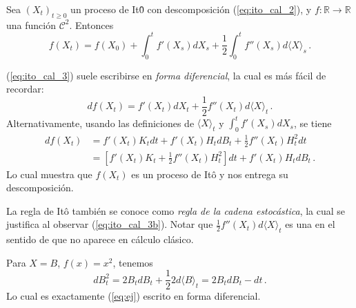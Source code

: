 \begin{theorem}
Sea $(X_t)_{t \ge 0}$ un proceso de It\^{0} con descomposición (\ref{eq:ito_cal_2}), y $f: \mathbb{R} \to  \mathbb{R}$ una función $\mathcal{C}^2$. Entonces 
\begin{equation*}
    \label{eq:ito_cal_3}
    \tag{$\star$}
    f(X_t)  = f(X_0) + \int_{0}^{t} f'(X_s) dX_s +  \frac{1}{2}\int_{0}^{t} f''(X_s) d \langle X \rangle_s\,.
\end{equation*}
\end{theorem}

\begin{remark}
(\ref{eq:ito_cal_3}) suele escribirse en \textit{forma diferencial}, la cual es más fácil de 
recordar: 
\begin{equation*}
    \label{eq:ito_cal_3b}
    \tag{$\square$}
    df(X_t) = f'(X_t)dX_t + \frac{1}{2} f''(X_t)d\langle X \rangle_t\,.
\end{equation*}
Alternativamente, usando las definiciones de $\langle X \rangle_t$  y $\int_{0}^{t} f'(X_s) dX_s$, se tiene 
\begin{align*}
    df(X_t) 
    &= f'(X_t) K_t dt + f'(X_t) H_t dB_t + \frac{1}{2} f''(X_t) H^2_t dt \\ 
    &= \left[ f'(X_t) K_t + \frac{1}{2} f''(X_t) H_t^2 \right] dt + f'(X_t) H_t dB_t \,.
\end{align*}
Lo cual muestra que $f(X_t)$ es un proceso de It\^{o} y nos entrega su descomposición.
\end{remark}
\begin{remark}
    La regla de It\^{o} también se conoce como \textit{regla de la cadena estocástica}, la cual se justifica al observar (\ref{eq:ito_cal_3b}). Notar que $\frac{1}{2}f''(X_t) d\langle X \rangle_t$ es una  en el sentido de que no aparece en cálculo clásico. 
\end{remark}
\begin{example}
    Para $X = B$, $f(x) = x^2$, tenemos 
    \begin{equation*}
            dB_t^2 = 2B_t dB_t + \frac{1}{2} 2 d \langle B \rangle_t = 2B_t dB_t - dt\,.
    \end{equation*}
    Lo cual es exactamente (\ref{eq:ej}) escrito en forma diferencial. 
\end{example}

